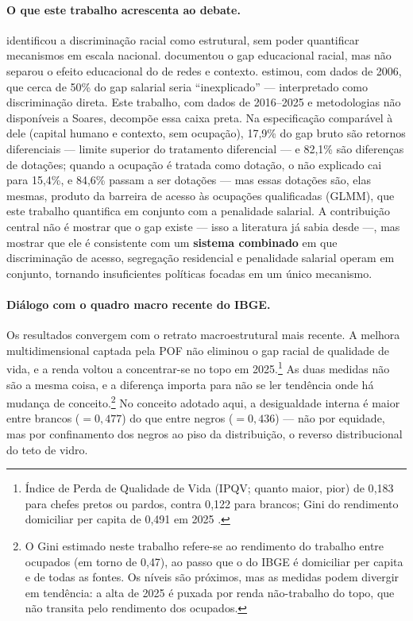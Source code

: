 \documentclass[11pt, a4paper, oneside]{article}
\begin{document}
\paragraph{O que este trabalho acrescenta ao debate.}
 identificou a discriminação racial como estrutural,
sem poder quantificar mecanismos em escala nacional.
 documentou o gap educacional racial, mas não separou
o efeito educacional do de redes e contexto.
 estimou, com dados de 2006, que cerca de 50\% do gap
salarial seria ``inexplicado'' --- interpretado como discriminação direta.
Este trabalho, com dados de 2016--2025 e metodologias não disponíveis
a Soares, decompõe essa {caixa preta}. Na especificação comparável à dele
(capital humano e contexto, sem ocupação), 17,9\% do gap bruto são retornos
diferenciais --- limite superior do tratamento diferencial --- e 82,1\% são
diferenças de dotações; quando a ocupação é tratada como dotação, o não explicado
cai para 15,4\%, e 84,6\% passam a ser dotações --- mas essas dotações são, elas mesmas,
produto da barreira de acesso às ocupações qualificadas (GLMM), que este
trabalho quantifica em conjunto com a penalidade salarial.
A contribuição central não é mostrar que o gap existe --- isso a
literatura já sabia desde  ---,
mas mostrar que ele é consistente com um
\textbf{sistema combinado} em que discriminação de acesso, segregação
residencial e penalidade salarial operam em conjunto, tornando
insuficientes políticas focadas em um único mecanismo.

\paragraph{Diálogo com o quadro macro recente do IBGE.}
Os resultados convergem com o retrato macroestrutural mais recente. A melhora multidimensional captada pela POF não eliminou o gap racial de qualidade de vida, e a renda voltou a concentrar-se no topo em 2025.\footnote{Índice de Perda de Qualidade de Vida (IPQV; quanto maior, pior) de 0{,}183 para chefes pretos ou pardos, contra 0{,}122 para brancos; Gini do rendimento domiciliar {per capita} de 0{,}491 em 2025 \cite{ibge_pof_2019, ibge_rendimentos_2025}.}
As duas medidas não são a mesma coisa, e a diferença importa para não se ler tendência onde há mudança de conceito.\footnote{O Gini estimado neste trabalho refere-se ao rendimento do trabalho entre ocupados (em torno de 0{,}47), ao passo que o do IBGE é domiciliar {per capita} e de todas as fontes. Os níveis são próximos, mas as medidas podem divergir em tendência: a alta de 2025 é puxada por renda não-trabalho do topo, que não transita pelo rendimento dos ocupados.} No conceito adotado aqui, a desigualdade {interna}
é maior entre brancos ($=0,477$) do que entre negros
($=0,436$) --- não por equidade, mas por confinamento dos
negros ao piso da distribuição, o reverso distribucional do teto de vidro.
\end{document}

